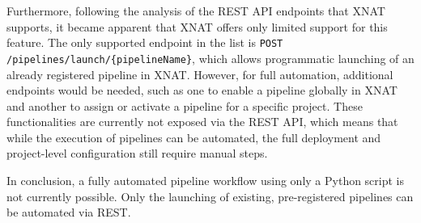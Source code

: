 Furthermore, following the analysis of the REST API endpoints that XNAT supports, it became apparent that XNAT offers only limited support for this feature. The only supported endpoint in the list is \texttt{POST /pipelines/launch/\{pipelineName\}}, which allows programmatic launching of an already registered pipeline in XNAT. However, for full automation, additional endpoints would be needed, such as one to enable a pipeline globally in XNAT and another to assign or activate a pipeline for a specific project. These functionalities are currently not exposed via the REST API, which means that while the execution of pipelines can be automated, the full deployment and project-level configuration still require manual steps.

In conclusion, a fully automated pipeline workflow using only a Python script is not currently possible. Only the launching of existing, pre-registered pipelines can be automated via REST.


